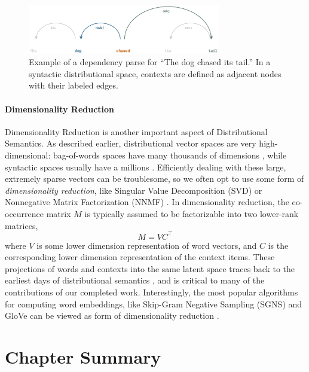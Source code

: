 \begin{figure}
  \centering
  \includegraphics[width=0.75\textwidth]{figures/syn}
\caption{Example of a dependency parse for ``The dog chased its tail.'' In
a syntactic distributional space, contexts are defined as adjacent nodes
with their labeled edges.}
\label{fig:syn}
\end{figure}

\paragraph{Dimensionality Reduction}
Dimensionality Reduction is another important aspect of Distributional Semantics.
As described earlier, distributional vector
spaces are very high-dimensional: bag-of-words spaces have many thousands of
dimensions \cite{turney:2010:jair,mikolov:2013:iclr,pennington:2014:emnlp},
while syntactic spaces usually have a millions \cite{baroni:2010:cl}.
Efficiently dealing with these large, extremely sparse vectors can be
troublesome, so we often opt to use some form of {\em dimensionality
reduction}, like Singular Value Decomposition (SVD)
\cite{deerwester:1990:jsis,landauer:1997:pr} or Nonnegative Matrix
Factorization (NNMF) \cite{lee:2000:nips}. In dimensionality reduction, the
co-occurrence matrix $M$ is typically assumed to be factorizable into two
lower-rank matrices,
\begin{equation}
  M = VC^{\top}
  \label{eqn:svd}
\end{equation}
where $V$ is some lower dimension representation of word vectors, and $C$ is
the corresponding lower dimension representation of the context items. These
projections of words and contexts into the same latent space traces back to the
earliest days of distributional semantics \cite{deerwester:1990:jsis}, and is
critical to many of the contributions of our completed work.  Interestingly,
the most popular algorithms for computing word embeddings, like Skip-Gram
Negative Sampling (SGNS) \cite{mikolov:2013:iclr} and GloVe
\cite{pennington:2014:emnlp} can be viewed as form of dimensionality reduction
\cite{levy:2014:nips,levy:2015:tacl}.

\section{Chapter Summary}

